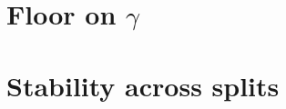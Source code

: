 \section{Floor on $\gamma$}\label{app:floor}

\begin{table}[h]
\centering
\caption{Worst-case loss (largest over the emp, gt and est attackers) for plain FSB, FSB with a floor $g$ on $\gamma$, and size-matched HPB, at $q=\qbar$ and $q=1000$ (fresh pool).}
\label{tab:floor}
\small
\setlength{\tabcolsep}{3pt}


\vspace{4pt}
\begin{minipage}{0.95\textwidth}\footnotesize

\end{minipage}
\end{table}

\section{Stability across splits}\label{app:splits}

\begin{table}[h]
\centering
\caption{Worst-case loss over the emp, gt and est attackers on four independent splits of the leak (mean $\pm$ sd over splits, minimum--maximum in parentheses).}
\label{tab:splits}
\footnotesize
\setlength{\tabcolsep}{3pt}


\vspace{4pt}
\begin{minipage}{0.95\textwidth}\footnotesize

\end{minipage}
\end{table}


